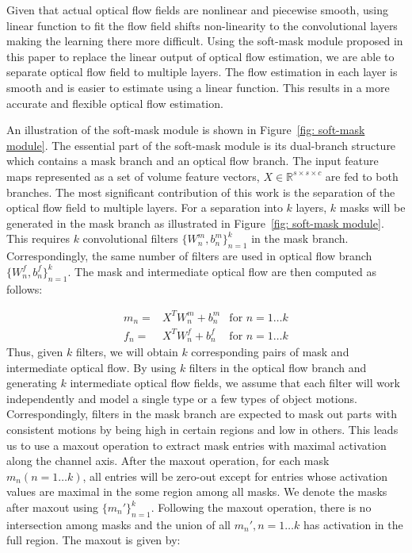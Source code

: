 \documentclass[10pt,twocolumn,letterpaper]{article}
\begin{document}
Given that actual optical flow fields are nonlinear and piecewise smooth, using linear function to fit the flow field shifts non-linearity to the convolutional layers making the learning there more difficult. Using the soft-mask module proposed in this paper to replace the linear output of optical flow estimation, we are able to separate optical flow field to multiple layers. The flow estimation in each layer is smooth and is easier to estimate using a linear function. This results in a more accurate and flexible optical flow estimation. 

An illustration of the soft-mask module is shown in Figure~\ref{fig: soft-mask module}. The essential part of the soft-mask module is its dual-branch structure which contains a mask branch and an optical flow branch. The input feature maps represented as a set of volume feature vectors, $X \in \mathbb{R}^{s\times s \times c}$ are fed to both branches. The most significant contribution of this work is the separation of the optical flow field to multiple layers. For a separation into $k$ layers, $k$ masks will be generated in the mask branch as illustrated in Figure~\ref{fig: soft-mask module}. This requires $k$ convolutional filters $\{W_n^m, b_n^m\}_{n=1}^k$ in the mask branch. Correspondingly, the same number of filters are used in optical flow branch $\{W_n^f, b_n^f\}_{n=1}^k$. The mask and intermediate optical flow are then computed as follows:

\begin{align}
\label{eqn: computation of masks and flows}
m_n =& X^T W_n^m + b_n^m &\! \text{for $n = 1\dots k$} \nonumber\\
f_n =& X^T W_n^f + b_n^f &\! \text{for $n = 1\dots k$}
\end{align}
Thus, given $k$ filters, we will obtain $k$ corresponding pairs of mask and intermediate optical flow. By using $k$ filters in the optical flow branch and generating $k$ intermediate optical flow fields, we assume that each filter will work independently and model a single type or a few types of object motions. Correspondingly, filters in the mask branch are expected to mask out parts with consistent motions by being high in certain regions and low in others. This leads us to use a maxout operation to extract mask entries with maximal activation along the channel axis. After the maxout operation, for each mask $m_n (n=1\dots k)$, all entries will be zero-out except for entries whose activation values are maximal in the some region among all masks. We denote the masks after maxout using $\{m_n'\}_{n=1}^k$. Following the maxout operation, there is no intersection among masks and the union of all $m_n', n=1\dots k$ has activation in the full region. The maxout is given by:
\end{document}
